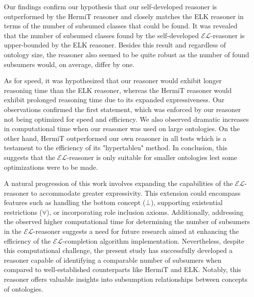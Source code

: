 \documentclass[a4paper]{article}
\theoremstyle{plain}
\theoremstyle{definition}
\begin{document}

Our findings confirm our hypothesis that our self-developed reasoner is outperformed by the HermiT reasoner and closely matches the ELK reasoner in terms of the number of subsumed classes that could be found. It was revealed that the number of subsumed classes found by the self-developed $\mathcal{EL}$-reasoner is upper-bounded by the ELK reasoner. Besides this result and regardless of ontology size, the reasoner also seemed to be quite robust as the number of found subsumers would, on average, differ by one.

As for speed, it was hypothesized that our reasoner would exhibit longer reasoning time than the ELK reasoner, whereas the HermiT reasoner would exhibit prolonged reasoning time due to its expanded expressiveness. Our observations confirmed the first statement, which was enforced by our reasoner not being optimized for speed and efficiency. We also observed dramatic increases in computational time when our reasoner was used on large ontologies. On the other hand, HermiT outperformed our own reasoner in all tests which is a testament to the efficiency of its "hypertableu" method. In conclusion, this suggests that the $\mathcal{EL}$-reasoner is only suitable for smaller ontologies lest some optimizations were to be made.

 A natural progression of this work involves expanding the capabilities of the $\mathcal{EL}$-reasoner to accommodate greater expressivity. This extension could encompass features such as handling the bottom concept ($\bot$), supporting existential restrictions ($\mathcal{\forall}$), or incorporating role inclusion axioms. Additionally, addressing the observed higher computational time for determining the number of subsumers in the $\mathcal{EL}$-reasoner suggests a need for future research aimed at enhancing the efficiency of the $\mathcal{EL}$-completion algorithm implementation. Nevertheless, despite this computational challenge, the present study has successfully developed a reasoner capable of identifying a comparable number of subsumers when compared to well-established counterparts like HermiT and ELK. Notably, this reasoner offers valuable insights into subsumption relationships between concepts of ontologies.
 



	
	
	\appendix
	

		
\end{document}
